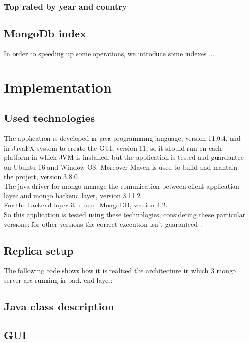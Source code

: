 \documentclass[a4paper, oneside]{article}
\begin{document}
\subsubsection{Top rated by year and country}

\subsection{MongoDb index}
In order to speeding up some operations, we introduce some indexes ...

\clearpage

\section{Implementation}
\subsection{Used technologies}
The application is developed in java programming language, version 11.0.4, and in JavaFX system to create the GUI, version 11, so it should run on each platform in which JVM is installed, but the application is tested and guardantee on Ubuntu 16 and Window OS. Moreover Maven is used  to build and mantain the project, version 3.8.0. \\
The java driver for mongo manage the comunication between client application layer and mongo backend layer, version 3.11.2.\\ 
For the backend layer it is used MongoDB, version 4.2.\\
So this application is tested using these technologies, considering these particular versions: for other versions the correct execution isn't guaranteed .\\

\subsection{Replica setup}
The following code shows how it is realized the architecture in which 3 mongo server are running in back end layer:
\vspace{2mm}

\vspace{5mm}
\subsection{Java class description}

\subsection{GUI}
\end{document}
